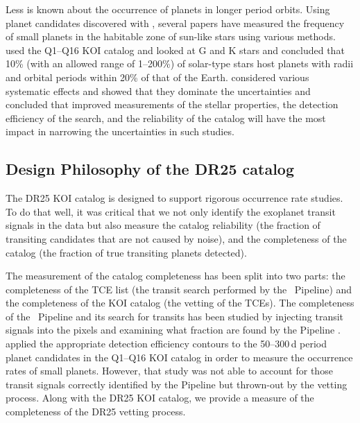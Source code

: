 Less is known about the occurrence of planets in longer period orbits. Using planet candidates discovered with \Kepler{}, several papers have measured the frequency of small planets in the habitable zone of sun-like stars \citep[see e.g.][]{Burke2015,ForemanMackey16,Petigura2013b} using various methods. \citet{Burke2015} used the Q1--Q16  KOI catalog \citep{Mullally2015cat} and looked at G and K stars and concluded that 10\% (with an allowed range of 1--200\%) of solar-type stars host planets with radii and orbital periods within 20\% of that of the Earth. \citet{Burke2015} considered various systematic effects and showed that they dominate the uncertainties and concluded that improved measurements of the stellar properties, the detection efficiency of the search, and the reliability of the catalog will have the most impact in narrowing the uncertainties in such studies. 


\subsection{Design Philosophy of the DR25 catalog}

The DR25 KOI catalog is designed to support rigorous occurrence rate studies. To do that well, it was critical that we not only identify the exoplanet transit signals in the data but also measure the catalog reliability (the fraction of transiting candidates that are not caused by noise), and the completeness of the catalog (the fraction of true transiting planets detected).

The measurement of the catalog completeness has been split into two parts: the completeness of the TCE list (the transit search performed by the \Kepler\ Pipeline) and the completeness of the KOI catalog (the vetting of the TCEs). The completeness of the \Kepler\ Pipeline and its search for transits has been studied by injecting transit signals into the pixels and examining what fraction are found by the \Kepler{} Pipeline \citep{Christiansen2017, Christiansen2015b,Christiansen2013a}. \citet{Burke2015} applied the appropriate detection efficiency contours \citep{Christiansen2015} to the 50--300\,d period planet candidates in the Q1--Q16 KOI catalog \citep{Mullally2015cat} in order to measure the occurrence rates of small planets. However, that study was not able to account for those transit signals correctly identified by the \Kepler{} Pipeline but thrown-out by the vetting process. Along with the DR25 KOI catalog, we provide a measure of the completeness of the DR25 vetting process. 

